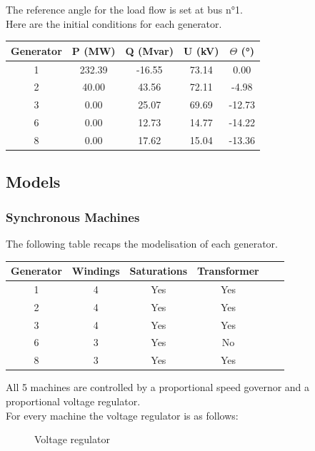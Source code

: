 \documentclass[a4paper, 12pt]{report}
\begin{document}
The reference angle for the load flow is set at bus n°1. \\

Here are the initial conditions for each generator.

\begin{center}
\begin{tabular}{|c|c|c|c|c|}
  \hline
  Generator & P (MW) & Q (Mvar) & U (kV) & $\Theta$ (°) \\
  \hline
  1 & 232.39 & -16.55 & 73.14 & 0.00\\
  2 & 40.00 & 43.56 & 72.11 & -4.98\\
  3 & 0.00 & 25.07 & 69.69 & -12.73\\
  6 & 0.00 & 12.73 & 14.77 & -14.22\\
  8 & 0.00 & 17.62 & 15.04 & -13.36\\
  \hline
\end{tabular}
\end{center}

\subsection{Models}
\label{ModelsIEEE}

\subsubsection{Synchronous Machines}

The following table recaps the modelisation of each generator.

\begin{center}
\begin{tabular}{|c|c|c|c|c|c|}
  \hline
  Generator & Windings  & Saturations & Transformer\\
  \hline
  1 & 4 & Yes & Yes\\
  2 & 4 & Yes & Yes\\
  3 & 4 & Yes & Yes\\
  6 & 3 & Yes & No\\
  8 & 3 & Yes & Yes\\
  \hline
\end{tabular}
\end{center}

All 5 machines are controlled by a proportional speed governor and a proportional voltage regulator. \\

For every machine the voltage regulator is as follows:
\begin{figure}[H]
\centering
{}
\caption{Voltage regulator}
\end{figure}
\end{document}
